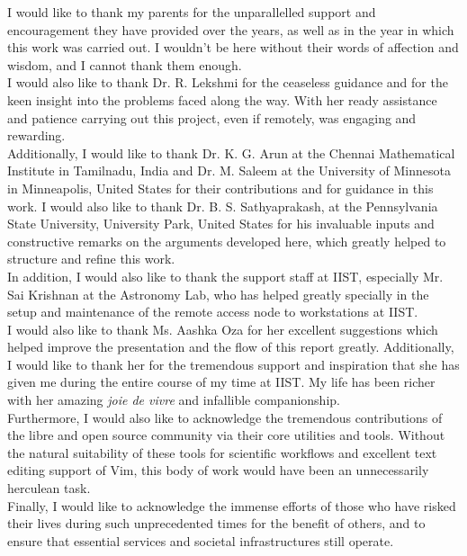 I would like to thank my parents for the unparallelled support and encouragement they
have provided over the years, as well as in the year in which this work was carried out.
I wouldn't be here without their words of affection and wisdom, and I cannot thank them
enough.\\
I would also like to thank Dr. R. Lekshmi for the ceaseless guidance and for the keen
insight into the problems faced along the way. With her ready assistance and patience
carrying out this project, even if remotely, was engaging and rewarding.\\
Additionally, I would like to thank Dr. K. G. Arun at the Chennai Mathematical Institute
in Tamilnadu, India and Dr. M. Saleem at the University of Minnesota in Minneapolis,
United States for their contributions and for guidance in this work. I would also like
to thank Dr. B. S. Sathyaprakash, at the Pennsylvania State University, University Park,
United States for his invaluable inputs and constructive remarks on the arguments
developed here, which greatly helped to structure and refine this work.\\
In addition, I would also like to thank the support staff at IIST, especially Mr. Sai
Krishnan at the Astronomy Lab, who has helped greatly specially in the setup and
maintenance of the remote access node to workstations at IIST.\\
I would also like to thank Ms. Aashka Oza for her excellent suggestions which helped
improve the presentation and the flow of this report greatly. Additionally, I would like
to thank her for the tremendous support and inspiration that she has given me during the
entire course of my time at IIST. My life has been richer with her amazing \emph{joie
de vivre} and infallible companionship.\\
Furthermore, I would also like to acknowledge the tremendous contributions of the libre
and open source community via their core utilities and tools. Without the natural
suitability of these tools for scientific workflows and excellent text editing support
of Vim, this body of work would have been an unnecessarily herculean task.\\
Finally, I would like to acknowledge the immense efforts of those who have risked
their lives during such unprecedented times for the benefit of others, and to ensure
that essential services and societal infrastructures still operate.

\vspace{8mm}
\hfill \Author \hspace{5mm}
